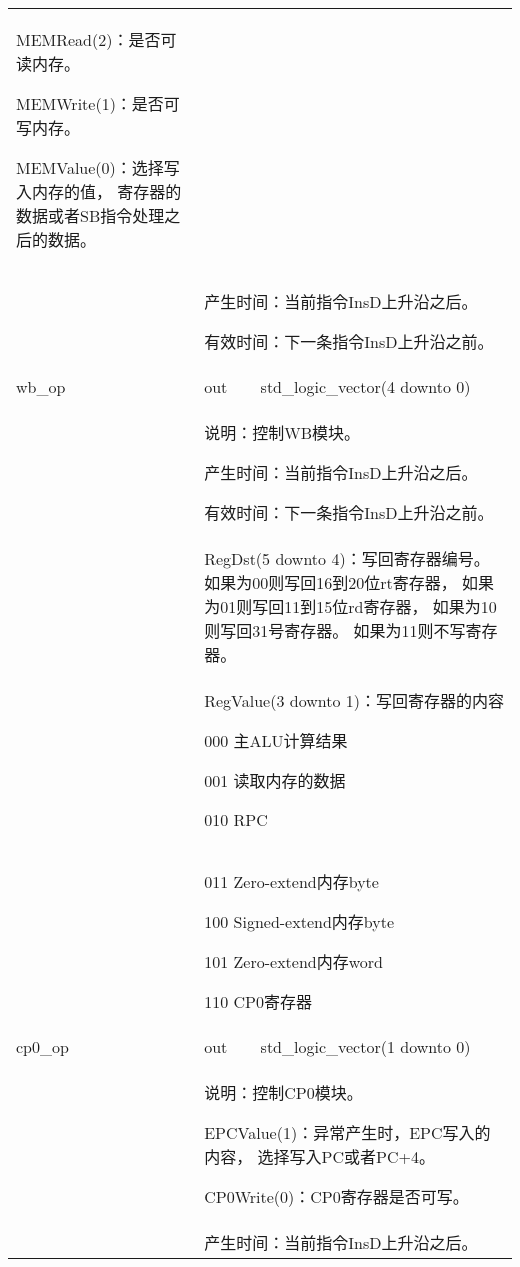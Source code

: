 \begin{tabularx}{\textwidth}{lll}
{                MEMRead(2)：是否可读内存。

                MEMWrite(1)：是否可写内存。

                MEMValue(0)：选择写入内存的值，%
                寄存器的数据或者SB指令处理之后的数据。
            } \\
            &
            \multicolumn{2}{X}{
                产生时间：当前指令InsD上升沿之后。

                有效时间：下一条指令InsD上升沿之前。
            } \\
            \midrule
            wb\_op          & out       & std\_logic\_vector(4 downto 0) \\
            \cmidrule(l){2-3}
            &
            \multicolumn{2}{X}{
                说明：控制WB模块。

                产生时间：当前指令InsD上升沿之后。

                有效时间：下一条指令InsD上升沿之前。 
            } \\
            &
            \multicolumn{2}{X}{
                RegDst(5 downto 4)：写回寄存器编号。
                如果为00则写回16到20位rt寄存器，%
                如果为01则写回11到15位rd寄存器，%
                如果为10则写回31号寄存器。
                如果为11则不写寄存器。
            } \\
            &
            \multicolumn{2}{X}{
                RegValue(3 downto 1)：写回寄存器的内容%

                000 主ALU计算结果

                001 读取内存的数据

                010 RPC
            } \\
            &
            \multicolumn{2}{X}{
                011 Zero-extend内存byte

                100 Signed-extend内存byte

                101 Zero-extend内存word

                110 CP0寄存器
            } \\
            \midrule
            cp0\_op         & out       & std\_logic\_vector(1 downto 0) \\
            \cmidrule(l){2-3}
            &
            \multicolumn{2}{X}{
                说明：控制CP0模块。

                EPCValue(1)：异常产生时，EPC写入的内容，%
                选择写入PC或者PC+4。

                CP0Write(0)：CP0寄存器是否可写。
            } \\
            &
            \multicolumn{2}{X}{
                产生时间：当前指令InsD上升沿之后。

}
\end{tabularx}
